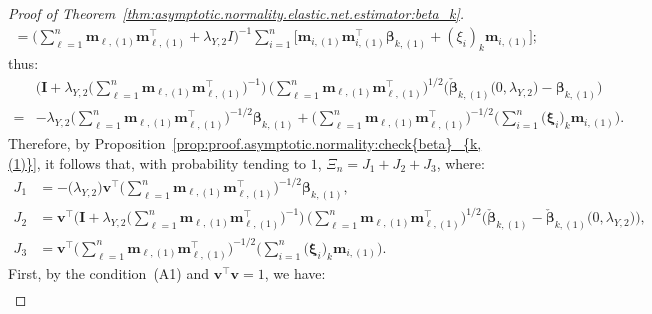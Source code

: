 \documentclass[
  12pt]{article}
\def\M{\mathbf{m}}
\def\X{\mathbf{x}}
\def\Z{\mathbf{z}}
\begin{document}
\begin{proof}[Proof of Theorem~\ref{thm:asymptotic.normality.elastic.net.estimator:beta_k}]
\begin{align*}
		=  \Big( \sum_{\ell = 1}^{n} \M_{\ell,(1)}   \M_{\ell , (1)}^{\top}  + \lambda_{Y,2} I      \Big)^{-1}  \sum_{i=1}^{n} \Big[      \M_{i,(1)} \M_{i,(1)}^{\top}  \bm{\beta}_{k,(1)}  +  ( \xi_{i} )_{k} \M_{i,(1)}   \Big];
	\end{align*}    
	thus:   
	\begin{align*}
		& \Big( \mathbf{I} + \lambda_{Y,2} \big(  \sum_{\ell = 1}^{n} \M_{\ell,(1)}  \M_{\ell,(1)}^{\top} \big)^{-1}  \Big) \,      
		\Big( \sum_{\ell = 1}^{n} \M_{\ell,(1)}  \M_{\ell,(1)}^{\top} \Big)^{1/2}  \Big(  \check{\bm{\beta}}_{k,(1)} \big( 0 , \lambda_{Y,2} \big)  -  \bm{\beta}_{k, (1)} \Big)  
		\\
		=&  - \lambda_{Y,2}   \Big( \sum_{\ell = 1}^{n} \M_{\ell,(1)}  \M_{\ell,(1)}^{\top} \Big)^{-1/2}  \bm{\beta}_{k, (1)}  
		+  \Big( \sum_{\ell = 1}^{n} \M_{\ell,(1)}  \M_{\ell,(1)}^{\top} \Big)^{-1/2}  \Big(  \sum_{i = 1}^{n} \big( \bm{\xi}_{i} \big)_{k}  \M_{i,(1)}  \Big)  . 
	\end{align*}
	Therefore, by  %
	Proposition~\ref{prop:proof.asymptotic.normality:check{beta}_{k,(1)}}, it follows that, with probability tending to $1$, $\Xi_{n} = J_{1} + J_{2} + J_{3}$, where: 
	\begin{align*}
		J_{1}  &=  - \big( \lambda_{Y,2} \big)  \mathbf{v}^{\top}  \Big(  \sum_{\ell = 1}^{n} \M_{\ell,(1)}  \M_{\ell,(1)}^{\top} \Big)^{-1/2}  \bm{\beta}_{k, (1)} , 
		\\
		J_{2}  &=    \mathbf{v}^{\top}  \Big( \mathbf{I} + \lambda_{Y,2} \big(  \sum_{\ell = 1}^{n} \M_{\ell,(1)}  \M_{\ell,(1)}^{\top} \big)^{-1}  \Big) \,      
		\Big( \sum_{\ell = 1}^{n} \M_{\ell,(1)}  \M_{\ell,(1)}^{\top} \Big)^{1/2}  \Big( \check{\bm{\beta}}_{k,(1)} -  \check{\bm{\beta}}_{k,(1)} \big( 0 , \lambda_{Y,2} \big)  \Big) , 
		\\
		J_{3}  &=  \mathbf{v}^{\top}   \Big( \sum_{\ell = 1}^{n} \M_{\ell,(1)}  \M_{\ell,(1)}^{\top} \Big)^{-1/2}  \Big(  \sum_{i = 1}^{n} \big( \bm{\xi}_{i} \big)_{k}  \M_{i,(1)}  \Big). 
	\end{align*}
	\indent   
	First, by the condition~(A1) and $\mathbf{v}^{\top} \mathbf{v} = 1$, we have: 
	\begin{align}

\end{align}
\end{proof}
\end{document}

